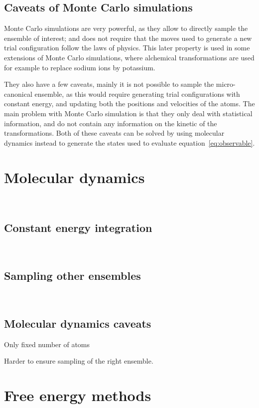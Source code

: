 \documentclass[thesis]{subfiles}
\begin{document}
\subsection{Caveats of Monte Carlo simulations}

Monte Carlo simulations are very powerful, as they allow to directly sample the
ensemble of interest; and does not require that the moves used to generate a new
trial configuration follow the laws of physics. This later property is used in
some extensions of Monte Carlo simulations, where alchemical transformations are
used for example to replace sodium ions by potassium.

They also have a few caveats, mainly it is not possible to sample the
micro-canonical ensemble, as this would require generating trial configurations
with constant energy, and updating both the positions and velocities of the
atoms. The main problem with Monte Carlo simulation is that they only deal with
statistical information, and do not contain any information on the kinetic of
the transformations. Both of these caveats can be solved by using molecular
dynamics instead to generate the states used to evaluate
equation~\eqref{eq:observable}.

\section{Molecular dynamics}
\label{sec:molecular-dynamics}
~


\subsection{Constant energy integration }
~

\subsection{Sampling other ensembles}
~

\subsection{Molecular dynamics caveats}

Only fixed number of atoms

Harder to ensure sampling of the right ensemble.

\section{Free energy methods}
~
\end{document}
